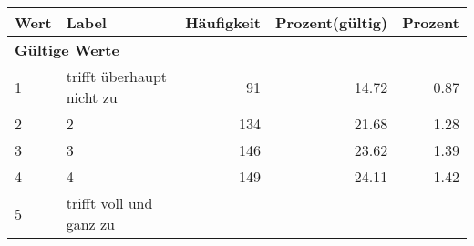      \begin{longtable}{lXrrr}
     \toprule
     \textbf{Wert} & \textbf{Label} & \textbf{Häufigkeit} & \textbf{Prozent(gültig)} & \textbf{Prozent} \\
     \endhead
     \midrule
     \multicolumn{5}{l}{\textbf{Gültige Werte}}\\

     1 &
     \multicolumn{1}{X}{ trifft überhaupt nicht zu   } &


       \num{91} &
       \num[round-mode=places,round-precision=2]{14.72} &
         \num[round-mode=places,round-precision=2]{0.87} \\

     2 &
     \multicolumn{1}{X}{ 2   } &


       \num{134} &
       \num[round-mode=places,round-precision=2]{21.68} &
         \num[round-mode=places,round-precision=2]{1.28} \\

     3 &
     \multicolumn{1}{X}{ 3   } &


       \num{146} &
       \num[round-mode=places,round-precision=2]{23.62} &
         \num[round-mode=places,round-precision=2]{1.39} \\

     4 &
     \multicolumn{1}{X}{ 4   } &


       \num{149} &
       \num[round-mode=places,round-precision=2]{24.11} &
         \num[round-mode=places,round-precision=2]{1.42} \\

     5 &
     \multicolumn{1}{X}{ trifft voll und ganz zu   } &



\end{longtable}
